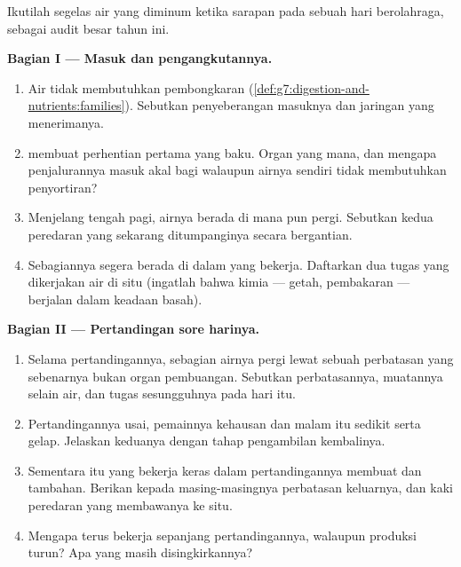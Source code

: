 \begin{problem}\label{pb:g7:removing-wastes:1}
Ikutilah segelas air yang diminum ketika sarapan pada sebuah hari
berolahraga, sebagai audit besar tahun ini.

\medskip\noindent\textbf{Bagian I --- Masuk dan pengangkutannya.}
\begin{enumerate}
  \item Air tidak membutuhkan pembongkaran
        (\cref{def:g7:digestion-and-nutrients:families}).
        Sebutkan penyeberangan masuknya dan jaringan  yang
        menerimanya.
  \item {} membuat perhentian pertama yang baku. Organ yang
        mana, dan mengapa penjalurannya masuk akal bagi 
        walaupun airnya sendiri tidak membutuhkan penyortiran?
  \item Menjelang tengah pagi, airnya berada di mana pun 
        pergi. Sebutkan kedua peredaran yang sekarang ditumpanginya
        secara bergantian.
  \item Sebagiannya segera berada di dalam  yang bekerja.
        Daftarkan dua tugas yang dikerjakan air di situ (ingatlah
        bahwa kimia  --- getah, pembakaran --- berjalan dalam
        keadaan basah).
\end{enumerate}

\medskip\noindent\textbf{Bagian II --- Pertandingan sore
harinya.}
\begin{enumerate}[resume]
  \item Selama pertandingannya, sebagian airnya pergi lewat sebuah
        perbatasan yang sebenarnya bukan organ pembuangan. Sebutkan
        perbatasannya, muatannya selain air, dan tugas sesungguhnya
        pada hari itu.
  \item Pertandingannya usai, pemainnya kehausan dan  malam
        itu sedikit serta gelap. Jelaskan keduanya dengan tahap
        pengambilan kembalinya.
  \item Sementara itu  yang bekerja keras dalam pertandingannya
        membuat  dan  tambahan. Berikan kepada
        masing-masingnya perbatasan keluarnya, dan kaki peredaran yang
        membawanya ke situ.
  \item Mengapa  terus bekerja sepanjang pertandingannya,
        walaupun produksi  turun? Apa yang masih
        disingkirkannya?
\end{enumerate}


\end{problem}
